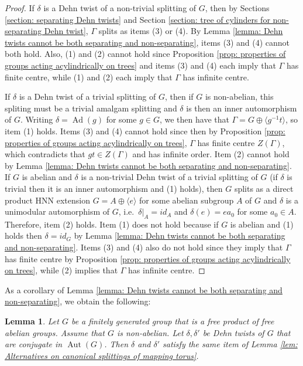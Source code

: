 \documentclass{amsart}
\DeclareMathOperator{\Aut}{Aut}
\DeclareMathOperator{\Ad}{Ad}
\theoremstyle{plain}
\newtheorem{lemma}[thm]{Lemma}
\theoremstyle{definition}
\theoremstyle{remark}
\begin{document}
\begin{proof}
    If $\delta$ is a Dehn twist of a non-trivial splitting of $G$, then by Sections \ref{section: separating Dehn twists} and Section \ref{section: tree of cylinders for non-separating Dehn twist}, $\Gamma$ splits as items (3) or (4). By Lemma \ref{lemma: Dehn twists cannot be both separating and non-separating}, items (3) and (4) cannot both hold. Also, (1) and (2) cannot hold since Proposition \ref{prop: properties of groups acting acylindrically on trees} and items (3) and (4) each imply that $\Gamma$ has finite centre, while (1) and (2) each imply that $\Gamma$ has infinite centre. 

    If $\delta$ is a Dehn twist of a trivial splitting of $G$, then if $G$ is non-abelian, this spliting must be a trivial amalgam splitting and $\delta$ is then an inner automorphism of $G$. Writing $\delta = \Ad(g)$ for some $g \in G$, we then have that $\Gamma = G \oplus \langle g^{-1}t \rangle$, so item (1) holds. Items (3) and (4) cannot hold since then by Proposition \ref{prop: properties of groups acting acylindrically on trees}, $\Gamma$ has finite centre $Z(\Gamma)$, which contradicts that $gt \in Z(\Gamma)$ and has infinite order. Item (2) cannot hold by Lemma \ref{lemma: Dehn twists cannot be both separating and non-separating}. If $G$ is abelian and $\delta$ is a non-trivial Dehn twist of a trivial splitting of $G$ (if $\delta$ is trivial then it is an inner automorphism and (1) holds), then $G$ splits as a direct product HNN extension $G=A \oplus \langle e \rangle$  for some abelian subgroup $A$ of $G$ and $\delta$ is a unimodular automorphism of $G$, i.e.\ $\delta \vert_A = id_A$ and $\delta(e) = ea_0$ for some $a_0 \in A$. Therefore, item (2) holds. Item (1) does not hold because if $G$ is abelian and (1) holds then $\delta = id_G$ by Lemma \ref{lemma: Dehn twists cannot be both separating and non-separating}. Items (3) and (4) also do not hold since they imply that $\Gamma$ has finite centre by Proposition \ref{prop: properties of groups acting acylindrically on trees}, while (2) implies that $\Gamma$ has infinite centre.
\end{proof}

As a corollary of Lemma \ref{lemma: Dehn twists cannot be both separating and non-separating}, we obtain the following:

\begin{lemma}
    \label{lem: alternative is conjugacy invariant}
    Let $G$ be a finitely generated group that is a free product of free abelian groups. Assume that $G$ is non-abelian. Let $\delta, \delta'$ be Dehn twists of $G$ that are conjugate in $\Aut(G)$. Then $\delta$ and $\delta'$ satisfy the same item of Lemma \ref{lem: Alternatives on canonical splittings of mapping torus}.  
\end{lemma}
\end{document}
